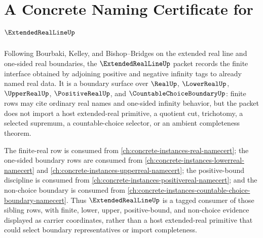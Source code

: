 \chapter{A Concrete Naming Certificate for $\ExtendedRealLineUp$}
\label{ch:concrete-instances-extended-real-line-namecert}

Following Bourbaki, Kelley, and Bishop--Bridges on the extended real line and one-sided real boundaries, the $\ExtendedRealLineUp$ packet records the finite interface obtained by adjoining positive and negative infinity tags to already named real data. It is a boundary surface over $\RealUp$, $\LowerRealUp$, $\UpperRealUp$, $\PositiveRealUp$, and $\CountableChoiceBoundaryUp$: finite rows may cite ordinary real names and one-sided infinity behavior, but the packet does not import a host extended-real primitive, a quotient cut, trichotomy, a selected supremum, a countable-choice selector, or an ambient completeness theorem.

The finite-real row is consumed from \autoref{ch:concrete-instances-real-namecert}; the one-sided boundary rows are consumed from \autoref{ch:concrete-instances-lowerreal-namecert} and \autoref{ch:concrete-instances-upperreal-namecert}; the positive-bound discipline is consumed from \autoref{ch:concrete-instances-positivereal-namecert}; and the non-choice boundary is consumed from \autoref{ch:concrete-instances-countable-choice-boundary-namecert}. Thus $\ExtendedRealLineUp$ is a tagged consumer of those sibling rows, with finite, lower, upper, positive-bound, and non-choice evidence displayed as carrier coordinates, rather than a host extended-real primitive that could select boundary representatives or import completeness.

